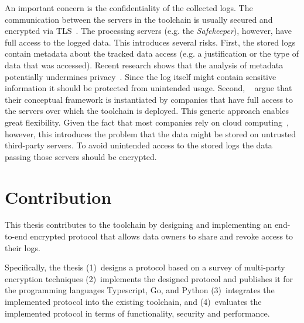 \documentclass[../main.tex]{subfiles}
\begin{document}
An important concern is the confidentiality of the collected logs.
The communication between the servers in the toolchain is usually secured and encrypted via TLS~\cite{Rescorla2000}.
The processing servers (e.g. the \emph{Safekeeper}), however, have full access to the logged data.
This introduces several risks.
First, the stored logs contain metadata about the tracked data access (e.g. a justification or the type of data that was accessed).
Recent research shows that the analysis of metadata potentially undermines privacy~\cite{Greschbach2012,Mayer2016}.
Since the log itself might contain sensitive information it should be protected from unintended usage.
Second, \citeauthor{Zieglmeier2021}~\cite{Zieglmeier2021} argue that their conceptual framework is instantiated by companies that have full access to the servers over which the toolchain is deployed.
This generic approach enables great flexibility.
Given the fact that most companies rely on cloud computing~\cite{Weber2021}, however, this introduces the problem that the data might be stored on untrusted third-party servers.
To avoid unintended access to the stored logs the data passing those servers should be encrypted.

\section{Contribution}

This thesis contributes to the toolchain by designing and implementing an end-to-end encrypted protocol that allows data owners to share and revoke access to their logs.

Specifically, the thesis 
(1)~designs a protocol based on a survey of multi-party encryption techniques
(2)~implements the designed protocol and publishes it for the programming languages Typescript, Go, and Python
(3)~integrates the implemented protocol into the existing toolchain, and 
(4)~evaluates the implemented protocol in terms of functionality, security and performance.
\end{document}
